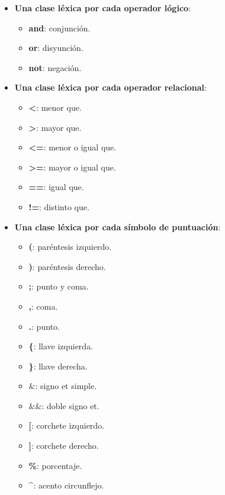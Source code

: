 \documentclass[11pt]{article}
\begin{document}
\begin{itemize}
            \item \textbf{Una clase léxica por cada operador lógico}:
            \begin{itemize}
                \item \textbf{and}: conjunción.
                \item \textbf{or}: disyunción.
                \item \textbf{not}: negación.
            \end{itemize}
            \item \textbf{Una clase léxica por cada operador relacional}:
            \begin{itemize}
                \item \textbf{\textless}: menor que.
                \item \textbf{\textgreater}: mayor que.
                \item \textbf{\textless=}: menor o igual que.
                \item \textbf{\textgreater=}: mayor o igual que.
                \item \textbf{==}: igual que.
                \item \textbf{!=}: distinto que.
            \end{itemize}
            \item \textbf{Una clase léxica por cada símbolo de puntuación}:
            \begin{itemize}
                \item \textbf{(}: paréntesis izquierdo.
                \item \textbf{)}: paréntesis derecho.
                \item \textbf{;}: punto y coma.
                \item \textbf{,}: coma.
                \item \textbf{.}: punto.
                \item \textbf{\{}: llave izquierda.
                \item \textbf{\}}: llave derecha.
                \item \textbf{$\&$}: signo et simple.
                \item \textbf{$\&\&$}: doble signo et.
                \item \textbf{[}: corchete izquierdo.
                \item \textbf{]}: corchete derecho.
                \item \textbf{\%}: porcentaje.
                \item \textbf{\^{}}: acento circunflejo.

\end{itemize}
\end{itemize}
\end{document}
